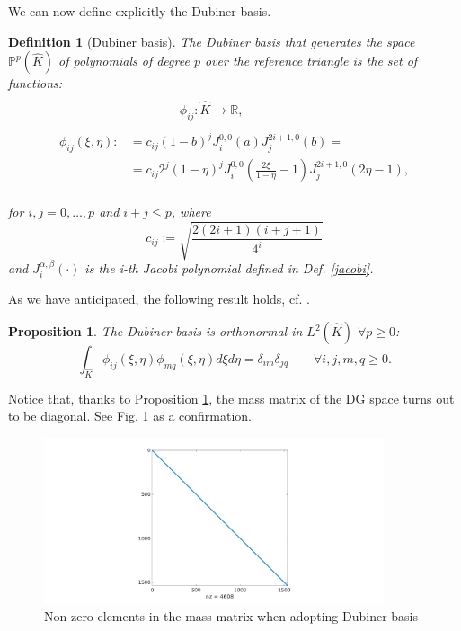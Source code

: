 \documentclass[a4paper,11pt]{article}
\newtheorem{definition}{Definition}
\newtheorem{prop}{Proposition}
\begin{document}
    \noindent We can now define explicitly the Dubiner basis.
    \begin{definition}[Dubiner basis] \label{dubiner}
    The Dubiner basis that generates the space $\mathbb{P}^p(\hat{K})$ of polynomials of degree $p$ over the reference triangle is the set of functions:
    \begin{equation*}
    \begin{split}
    \\
    & \quad \quad\quad  \quad \phi_{ij}: \hat{K} \rightarrow \mathbb{R}, \\ \\
    \phi_{ij}(\xi,\eta) :&= c_{ij}(1-b)^j J_i^{0,0}(a) J_j^{2i+1,0}(b)=
    \\&=c_{ij} 2^j (1-\eta)^j J_i^{0,0}(\frac{2\xi}{1-\eta}-1) J_j^{2i+1,0} (2\eta-1),
    \end{split}
    \end{equation*}
    \vspace{3mm} \\
    for $i,j=0,\dots,p$ and $i+j \le p$, where
    \begin{equation*}
    c_{ij} := \sqrt{\frac{2(2i+1)(i+j+1)}{4^i}}
    \end{equation*}
    and $J_i^{\alpha,\beta}(\cdot)$ is the i-th Jacobi polynomial defined in Def. \ref{jacobi}.
    \end{definition}
    
    \vspace{5mm}
    \noindent As we have anticipated, the following result holds, cf.  \cite{sherwin}.
    \begin{prop}\label{l2_ortho}
    The Dubiner basis is orthonormal in $L^2(\hat{K})$ $\forall p \geq 0$:
    \begin{equation*}
    \int_{\hat{K}}{\phi_{ij}(\xi,\eta)\phi_{mq}(\xi,\eta) d\xi d\eta}=\delta_{im}\delta_{jq} \qquad \forall i,j,m,q \geq 0.
    \end{equation*}
    \end{prop}
    \vspace{4mm}
    \noindent Notice that, thanks to Proposition \ref{l2_ortho}, the mass matrix of the DG space turns out to be diagonal. See Fig. \ref{mass} as a confirmation.
    
    \begin{figure}[ht]
    \begin{center}
    \includegraphics[width = 10cm]{./mass_dubiner.jpg}
    	\caption{Non-zero elements in the mass matrix when adopting Dubiner basis}
    	\label{mass}
    \end{center}
    \end{figure}
\end{document}
